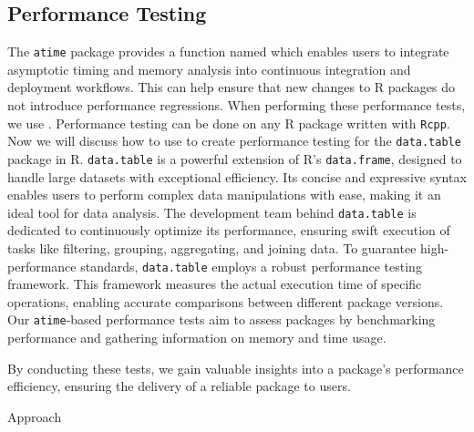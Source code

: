 \subsection{Performance Testing}
The \texttt{atime} package provides a function named  which enables users to integrate asymptotic timing and memory analysis into continuous integration and deployment workflows. 
This can help ensure that new changes to R packages do not introduce performance regressions. When performing these performance tests, we use .
Performance testing can be done on any R package written with \texttt{Rcpp}.\\

\noindent Now we will discuss how to use  to create performance testing for the \texttt{data.table} package in R.
\texttt{data.table} is a powerful extension of R's \texttt{data.frame}, designed to handle large datasets with exceptional efficiency. Its concise and expressive syntax enables users to perform complex data manipulations with ease, making it an ideal tool for data analysis. The development team behind \texttt{data.table} is dedicated to continuously optimize its performance, ensuring swift execution of tasks like filtering, grouping, aggregating, and joining data.
\vspace{0.1in}
To guarantee high-performance standards, \texttt{data.table} employs a robust performance testing framework. This framework measures the actual execution time of specific operations, enabling accurate comparisons between different package versions. 
Our \texttt{atime}-based performance tests aim to assess packages by benchmarking performance and gathering information on memory and time usage.

\vspace{0.1in}
By conducting these tests, we gain valuable insights into a package's performance efficiency, ensuring the delivery of a reliable package to users.
\vspace{0.1in}

\noindent Approach

